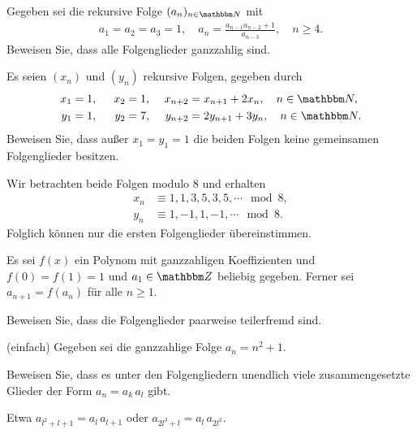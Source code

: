 \documentclass[11pt,a4paper]{article}
\begin{document}
\begin{aufgabe} Gegeben sei die rekursive Folge $(a_n)_{n\in\N } $ mit
\begin{gather*}
a_1=a_2=a_3=1,\quad a_{n}=\frac{a_{n-1}a_{n-2} +1}{a_{n-3}}, \quad n\ge 4.
\end{gather*}
Beweisen Sie, dass alle Folgenglieder ganzzahlig sind.
\end{aufgabe}

\begin{aufgabe} 
Es seien $(x_n)$ und $(y_n)$ rekursive Folgen, gegeben durch
\begin{alignat*}{3}
x_1&=1,\,\,& x_2& = 1,& \,\, x_{n+2}& =x_{n+1} +2 x_{n} ,\quad n\in\N,\\
y_1&= 1,&\,\, y_2&= 7,&\,\, y_{n+2}& = 2y_{n+1} +3 y_{n},\quad n\in \N.
\end{alignat*}
Beweisen Sie, dass außer $x_1=y_1=1$ die beiden Folgen keine gemeinsamen
Folgenglieder besitzen.
\end{aufgabe}

\begin{beweis} Wir betrachten beide Folgen modulo $8$ und erhalten
\begin{align*}
x_n&\equiv 1,1,3,5,3,5,\cdots \mod{8},\\
y_n&\equiv  1,-1,1,-1,\cdots \mod{8}.
\end{align*}
Folglich können nur die ersten Folgenglieder übereinstimmen.
\end{beweis}

\begin{aufgabe} 
Es sei $f(x) $ ein Polynom mit ganzzahligen Koeffizienten und $f(0)=f(1)=1$ und
$a_1\in \Z $ beliebig gegeben.  Ferner sei $a_{n+1} =f(a_n)$ für alle $n\ge 1$.

Beweisen Sie, dass die Folgenglieder paarweise teilerfremd sind.
\end{aufgabe}

\begin{aufgabe} (einfach)
Gegeben sei die ganzzahlige Folge $a_n=n^2+1$.

Beweisen Sie, dass es unter den Folgengliedern unendlich viele zusammengesetzte
Glieder der Form $a_n=a_k \,a_l$ gibt.
\end{aufgabe}

\begin{beweis} Etwa $a_{l^2 +l+1}= a_{l} \,a_{l+1}$ oder 
$a_{2l^3 + l}=a_l \, a_{2l^2}$.
\end{beweis}
\end{document}
